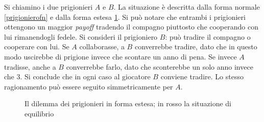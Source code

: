 Si chiamino i due prigionieri $A$ e $B$.
La situazione è descritta dalla forma normale \ref{prigionierofn} e dalla forma estesa \ref{extensive}.
Si può notare che entrambi i prigionieri ottengono un maggior \emph{payoff} tradendo il compagno piuttosto che cooperando con lui rimanendogli fedele.
Si consideri il prigioniero $B$: può tradire il compagno o cooperare con lui.
Se $A$ collaborasse, a $B$ converrebbe tradire, dato che in questo modo uscirebbe di prigione invece che scontare un anno di pena.
Se invece $A$ tradisse, anche a $B$ converrebbe farlo, dato che sconterebbe un solo anno invece che 3.
Si conclude che in ogni caso al giocatore $B$ conviene tradire.
Lo stesso ragionamento può essere seguito simmetricamente per $A$.


\begin{center}
   
\begin{figure}[!htbp]




    \caption{Il dilemma dei prigionieri in forma estesa; in rosso la situazione di equilibrio}
    \label{extensive}
\end{figure}
\end{center}


